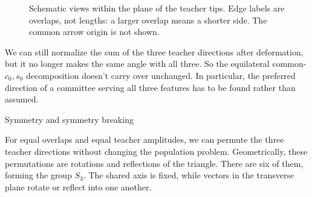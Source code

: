 \documentclass[11pt, reqno]{amsart}
\makeatletter
\def\section{\@startsection{section}{1}%
  \z@{.7\linespacing\@plus\linespacing}{.5\linespacing}%
  {\normalfont\scshape\centering}}
\theoremstyle{notestyle}
\theoremstyle{defstyle}
\makeatother
\begin{document}
\begin{figure}[htbp]
\centering
{}
\caption{Schematic views within the plane of the teacher tips.
Edge labels are overlaps, not lengths: a larger overlap means a
shorter side. The common arrow origin is not shown.}
\end{figure}

We can still normalize the sum of the three teacher directions after
deformation, but it no longer makes the same angle with all three.
So the equilateral common-$c_0,s_0$ decomposition doesn't carry over
unchanged. In particular, the preferred direction of a committee
serving all three features has to be found rather than assumed.

\section{Symmetry and symmetry breaking}

For equal overlaps and equal teacher amplitudes, we can permute the
three teacher directions without changing the population problem.
Geometrically, these permutations are rotations and reflections of
the triangle. There are six of them, forming the group $S_3$.
The shared axis is fixed, while vectors in the transverse plane rotate
or reflect into one another.
\end{document}
